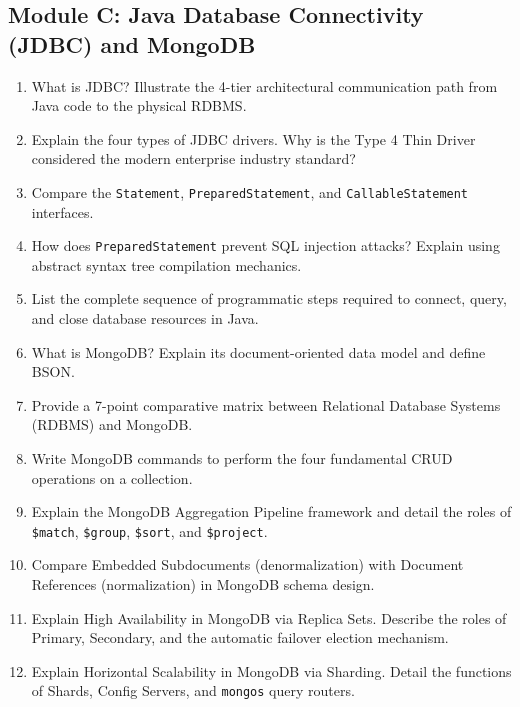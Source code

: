 \subsection{Module C: Java Database Connectivity (JDBC) and MongoDB}
\begin{enumerate}[resume]
    \item What is JDBC? Illustrate the 4-tier architectural communication path from Java code to the physical RDBMS.
    \item Explain the four types of JDBC drivers. Why is the Type 4 Thin Driver considered the modern enterprise industry standard?
    \item Compare the \texttt{Statement}, \texttt{PreparedStatement}, and \texttt{CallableStatement} interfaces.
    \item How does \texttt{PreparedStatement} prevent SQL injection attacks? Explain using abstract syntax tree compilation mechanics.
    \item List the complete sequence of programmatic steps required to connect, query, and close database resources in Java.
    \item What is MongoDB? Explain its document-oriented data model and define BSON.
    \item Provide a 7-point comparative matrix between Relational Database Systems (RDBMS) and MongoDB.
    \item Write MongoDB commands to perform the four fundamental CRUD operations on a collection.
    \item Explain the MongoDB Aggregation Pipeline framework and detail the roles of \texttt{\$match}, \texttt{\$group}, \texttt{\$sort}, and \texttt{\$project}.
    \item Compare Embedded Subdocuments (denormalization) with Document References (normalization) in MongoDB schema design.
    \item Explain High Availability in MongoDB via Replica Sets. Describe the roles of Primary, Secondary, and the automatic failover election mechanism.
    \item Explain Horizontal Scalability in MongoDB via Sharding. Detail the functions of Shards, Config Servers, and \texttt{mongos} query routers.
\end{enumerate}


